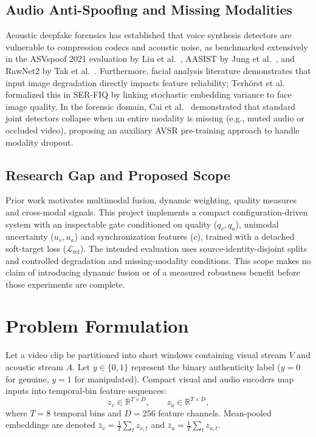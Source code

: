 \documentclass[conference]{IEEEtran}
\begin{document}
\subsection{Audio Anti-Spoofing and Missing Modalities}
Acoustic deepfake forensics has established that voice synthesis detectors are vulnerable to compression codecs and acoustic noise, as benchmarked extensively in the ASVspoof 2021 evaluation by Liu et al.~\cite{liu2023asvspoof}, AASIST by Jung et al.~\cite{jung2022aasist}, and RawNet2 by Tak et al.~\cite{tak2021rawnet2}. Furthermore, facial analysis literature demonstrates that input image degradation directly impacts feature reliability; Terh{\"o}rst et al.~\cite{terhorst2020serfiq} formalized this in SER-FIQ by linking stochastic embedding variance to face image quality. In the forensic domain, Cai et al.~\cite{cai2025modality} demonstrated that standard joint detectors collapse when an entire modality is missing (e.g., muted audio or occluded video), proposing an auxiliary AVSR pre-training approach to handle modality dropout.

\subsection{Research Gap and Proposed Scope}
Prior work motivates multimodal fusion, dynamic weighting, quality measures and cross-modal signals. This project implements a compact configuration-driven system with an inspectable gate conditioned on quality ($q_v,q_a$), unimodal uncertainty ($u_v,u_a$) and synchronization features ($c$), trained with a detached soft-target loss ($\mathcal{L}_{\mathrm{rel}}$). The intended evaluation uses source-identity-disjoint splits and controlled degradation and missing-modality conditions. This scope makes no claim of introducing dynamic fusion or of a measured robustness benefit before those experiments are complete.

\section{Problem Formulation}
Let a video clip be partitioned into short windows containing visual stream $V$ and acoustic stream $A$. Let $y \in \{0, 1\}$ represent the binary authenticity label ($y=0$ for genuine, $y=1$ for manipulated). Compact visual and audio encoders map inputs into temporal-bin feature sequences:
\begin{equation}
  z_v \in \mathbb{R}^{T \times D}, \qquad z_a \in \mathbb{R}^{T \times D},
\end{equation}
where $T=8$ temporal bins and $D=256$ feature channels. Mean-pooled embeddings are denoted $\bar{z}_v = \frac{1}{T}\sum_t z_{v,t}$ and $\bar{z}_a = \frac{1}{T}\sum_t z_{a,t}$.
\end{document}
